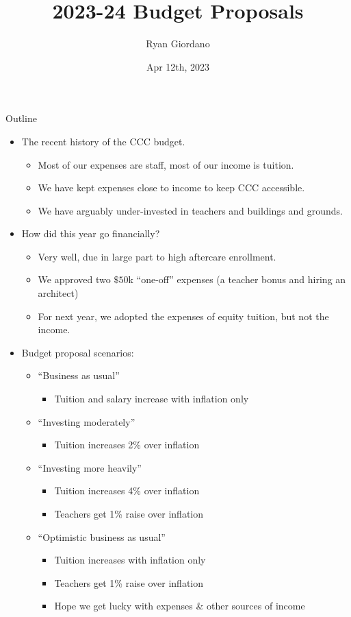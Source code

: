 \documentclass[8pt]{beamer}
\title{2023-24 Budget Proposals}
\author{Ryan Giordano}
\date{Apr 12th, 2023}
\institute{Children's Community Center}
\begin{document}
\def\subitem#1{\begin{itemize}\item #1\end{itemize}}



\begin{frame}{Outline}

%
\begin{itemize}
%
\item The recent history of the CCC budget.
\begin{itemize}
    \item Most of our expenses are staff, most of our income is tuition.
    \item We have kept expenses close to income to keep CCC accessible.
    \item We have arguably under-invested in teachers and buildings and grounds.
\end{itemize}
\pause
\item How did this year go financially?
\begin{itemize}
    \item Very well, due in large part to high aftercare enrollment.
    \item We approved two $\$50$k ``one-off'' expenses (a teacher bonus and hiring an architect)
    \item For next year, we adopted the expenses of equity tuition, but not the income.
\end{itemize}
\pause
\item Budget proposal scenarios:
\begin{itemize}
    \item ``Business as usual''
        \subitem{Tuition and salary increase with inflation only}
    \item ``Investing moderately''
        \subitem{Tuition increases 2\% over inflation}
    \item ``Investing more heavily''
        \begin{itemize}
        \item Tuition increases 4\% over inflation
        \item Teachers get 1\% raise over inflation
        \end{itemize}
    \item ``Optimistic business as usual''
        \begin{itemize}
        \item Tuition increases with inflation only
        \item Teachers get 1\% raise over inflation
        \item Hope we get lucky with expenses \& other sources of income
        \end{itemize}
%
\end{itemize}
\end{itemize}
%
\end{frame}
\end{document}

